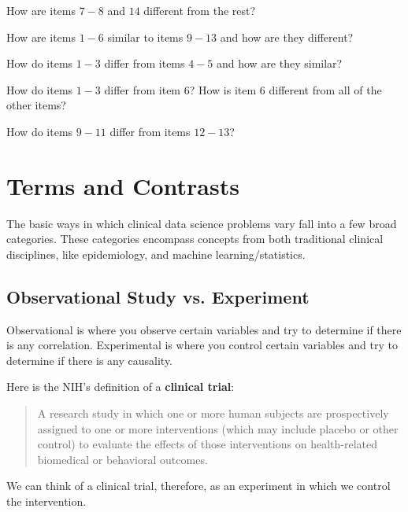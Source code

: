 \begin{question}{}
How are items $7-8$ and $14$ different from the rest? 
\end{question}

\begin{question}{}
How are items $1-6$ similar to items $9-13$ and how are they different? 
\end{question}

\begin{question}{}
How do items $1-3$ differ from items $4-5$ and how are they similar? 
\end{question}

\begin{question}{}
How do items $1-3$ differ from item $6$? How is item $6$ different from all of the other items? 
\end{question}

\begin{question}{}
How do items $9-11$ differ from items $12-13$? 
\end{question}


\section{Terms and Contrasts}

The basic ways in which clinical data science problems vary fall into a few broad categories. These categories encompass concepts from both traditional clinical disciplines, like epidemiology, and machine learning/statistics.

\subsection{Observational Study vs. Experiment}

Observational is where you observe certain variables and try to determine if there is any correlation. Experimental is where you control certain variables and try to determine if there is any causality.

Here is the NIH's definition of a \textbf{clinical trial}:
\begin{quote}
A research study in which one or more human subjects are prospectively assigned to one or more interventions (which may include placebo or other control) to evaluate the effects of those interventions on health-related biomedical or behavioral outcomes.
\end{quote}
We can think of a clinical trial, therefore, as an experiment in which we control the intervention. 

